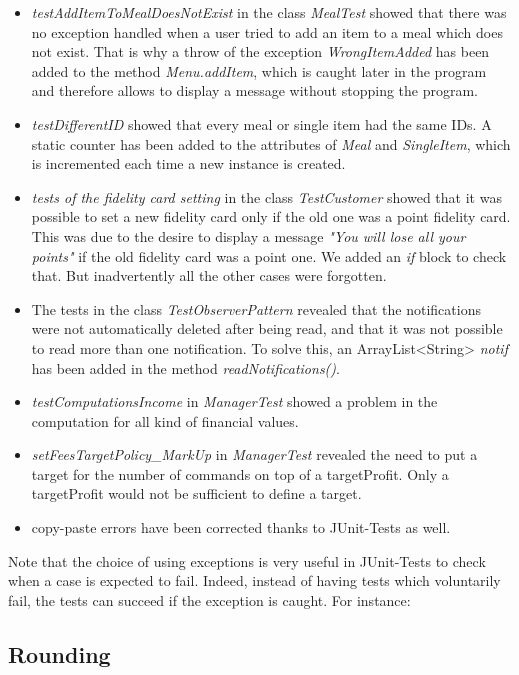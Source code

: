 \begin{itemize}
	\item{\textit{testAddItemToMealDoesNotExist}} in the class \textit{MealTest} showed that there was no exception handled when a user tried to add an item to a meal which does not exist. That is why a throw of the exception \textit{WrongItemAdded} has been added to the method \textit{Menu.addItem}, which is caught later in the program and therefore allows to display a message without stopping the program.
	\item{\textit{testDifferentID}} showed that every meal or single item had the same IDs. A static counter has been added to the attributes of \textit{Meal} and \textit{SingleItem}, which is incremented each time a new instance is created.
	\item{\textit{tests of the fidelity card setting}} in the class \textit{TestCustomer} showed that it was possible to set a new fidelity card only if the old one was a point fidelity card. This was due to the desire to display a message \textit{"You will lose all your points"} if the old fidelity card was a point one. We added an \textit{if} block to check that. But inadvertently all the other cases were forgotten.
	\item The tests in the class \textit{TestObserverPattern} revealed that the notifications were not automatically deleted after being read, and that it was not possible to read more than one notification. To solve this, an ArrayList<String> \textit{notif} has been added in the method \textit{readNotifications()}.
	\item{\textit{testComputationsIncome}} in \textit{ManagerTest} showed a problem in the 
		computation for all kind of financial values.
	\item{\textit{setFeesTargetPolicy\_MarkUp}} in \textit{ManagerTest} revealed the need to put
		a target for the number of commands on top of a targetProfit. Only a targetProfit 
		would not be sufficient to define a target.	
	\item{} copy-paste errors have been corrected thanks to JUnit-Tests as well.
\end{itemize}
Note that the choice of using exceptions is very useful in JUnit-Tests to check when a case is expected to fail. Indeed, instead of having tests which voluntarily fail, the tests can succeed if the exception is caught. For instance:


\subsection{Rounding}
\label{sub:rounding}

